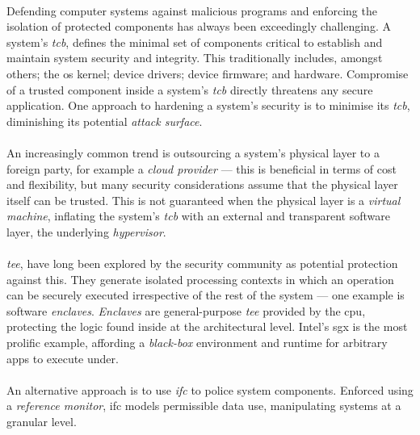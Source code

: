 


\paragraph{} Defending computer systems against malicious programs and enforcing the isolation of protected components has always been exceedingly challenging. A system's \textit{\acrfull{tcb}}, defines the minimal set of components critical to establish and maintain system security and integrity. This traditionally includes, amongst others; the \acrshort{os} kernel; device drivers; device firmware; and hardware. Compromise of a trusted component inside a system's \textit{\acrshort{tcb}} directly threatens any secure application. One approach to hardening a system's security is to minimise its \textit{\acrshort{tcb}}, diminishing its potential \textit{attack surface}. 

\paragraph{} An increasingly common trend is outsourcing a system's physical layer to a foreign party, for example a \textit{cloud provider} --- this is beneficial in terms of cost and flexibility, but many security considerations assume that the physical layer itself can be trusted. This is not guaranteed when the physical layer is a \textit{virtual machine}, inflating the system's \textit{\acrshort{tcb}} with an external and transparent software layer, the underlying \textit{hypervisor}.

\paragraph{} \textit{\acrfull{tee}}, have long been explored by the security community as potential protection against this. They generate isolated processing contexts in which an operation can be securely executed irrespective of the rest of the system --- one example is software \textit{enclaves}. \textit{Enclaves} are general-purpose \textit{\acrshort{tee}} provided by the \acrshort{cpu}, protecting the logic found inside at the architectural level. Intel's \acrfull{sgx} is the most prolific example, affording a \textit{black-box} environment and runtime for arbitrary apps to execute under.

\paragraph{} An alternative approach is to use \textit{\acrfull{ifc}} to police system components. Enforced using a \textit{reference monitor}, \acrshort{ifc} models permissible data use, manipulating systems at a granular level.

